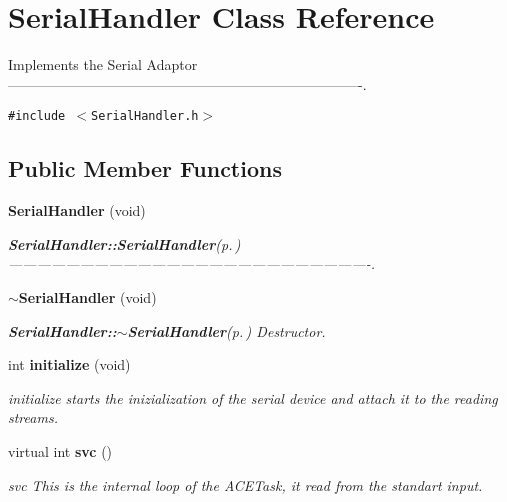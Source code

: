 \section{Serial\-Handler Class Reference}
\label{classSerialHandler}
Implements the Serial Adaptor ----------------------------------------------------------------------------.  


{\tt \#include $<$Serial\-Handler.h$>$}

\subsection*{Public Member Functions}
\begin{CompactItemize}
\item 
{\bf Serial\-Handler} (void)
\begin{CompactList}\small\item\em {\bf Serial\-Handler::Serial\-Handler}{\rm (p.\,\pageref{classSerialHandler_a0})} ----------------------------------------------------------------------------. \item\end{CompactList}\item 
{\bf $\sim$Serial\-Handler} (void)
\begin{CompactList}\small\item\em {\bf Serial\-Handler::$\sim$Serial\-Handler}{\rm (p.\,\pageref{classSerialHandler_a1})} Destructor. \item\end{CompactList}\item 
int {\bf initialize} (void)
\begin{CompactList}\small\item\em initialize starts the inizialization of the serial device and attach it to the reading streams. \item\end{CompactList}\item 
virtual int {\bf svc} ()
\begin{CompactList}\small\item\em svc This is the internal loop of the ACETask, it read from the standart input. \item\end{CompactList}\end{CompactItemize}
